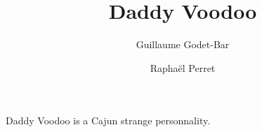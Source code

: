 \documentclass{rpg_non_player_character}
\title{Daddy Voodoo}
\begin{document}
\author{Guillaume Godet-Bar \and Rapha\"el Perret}
\maketitle

Daddy Voodoo is a Cajun strange personnality. 
\end{document}
